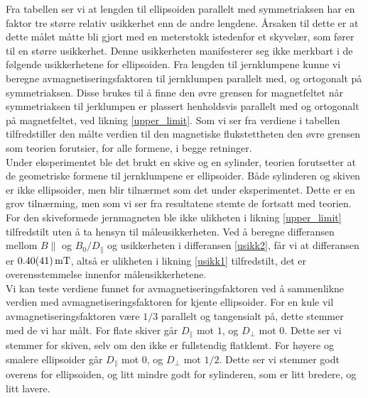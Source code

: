 \documentclass[%
 reprint,
 amsmath,amssymb,
 aps,
 norsk,
]{revtex4-1}
\begin{document}
Fra tabellen ser vi at lengden til ellipsoiden parallelt med symmetriaksen har en faktor tre større relativ usikkerhet enn de andre lengdene. Årsaken til dette er at dette målet måtte bli gjort med en meterstokk istedenfor et skyvelær, som fører til en større usikkerhet. Denne usikkerheten manifesterer seg ikke merkbart i de følgende usikkerhetene for ellipsoiden. Fra lengden til jernklumpene kunne vi beregne avmagnetiseringsfaktoren til jernklumpen parallelt med, og ortogonalt på symmetriaksen. Disse brukes til å finne den øvre grensen for magnetfeltet når symmetriaksen til jerklumpen er plassert henholdsvis parallelt med og ortogonalt på magnetfeltet, ved likning \eqref{upper_limit}. Som vi ser fra verdiene i tabellen tilfredstiller den målte verdien til den magnetiske flukstettheten den øvre grensen som teorien forutsier, for alle formene, i begge retninger.\\
Under eksperimentet ble det brukt en skive og en sylinder, teorien forutsetter at de geometriske formene til jernklumpene er ellipsoider. Både sylinderen og skiven er ikke ellipsoider, men blir tilnærmet som det under eksperimentet. Dette er en grov tilnærming, men som vi ser fra resultatene stemte de fortsatt med teorien. For den skiveformede jernmagneten ble ikke ulikheten i likning \eqref{upper_limit} tilfredstilt uten å ta hensyn til måleusikkerheten. Ved å beregne differansen mellom $B\parallel$ og $B_0/D_{\parallel}$ og usikkerheten i differansen \eqref{usikk2}, får vi at differansen er $\SI{0.4\pm0.41}{\milli\tesla}$, altså er ulikheten i likning \eqref{usikk1} tilfredstilt, det er overensstemmelse innenfor måleusikkerhetene.\\
Vi kan teste verdiene funnet for avmagnetiseringsfaktoren ved å sammenlikne verdien med avmagnetiseringsfaktoren for kjente ellipsoider. For en kule vil avmagnetiseringsfaktoren være $1/3$ parallelt og tangensialt på, dette stemmer med de vi har målt. For flate skiver går $D_{\parallel}$ mot $1$, og $D_{\perp}$ mot $0$. Dette ser vi stemmer for skiven, selv om den ikke er fullstendig flatklemt. For høyere og smalere ellipsoider går $D_{\parallel}$ mot $0$, og $D_{\perp}$ mot $1/2$. Dette ser vi stemmer godt overens for ellipsoiden, og litt mindre godt for sylinderen, som er litt bredere, og litt lavere.
\par
\end{document}
